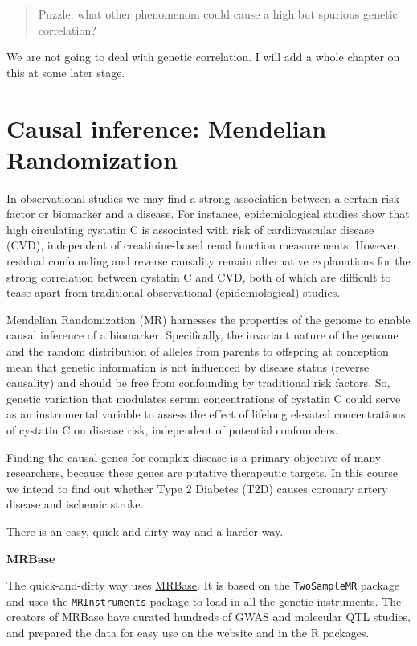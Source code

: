 \documentclass[
]{book}
\begin{document}
\begin{quote}
Puzzle: what other phenomenom could cause a high but spurious genetic correlation?
\end{quote}

We are not going to deal with genetic correlation. I will add a whole chapter on this at some later stage.

\hypertarget{causal-inference-mendelian-randomization}{%
\section{Causal inference: Mendelian Randomization}\label{causal-inference-mendelian-randomization}}

In observational studies we may find a strong association between a certain risk factor or biomarker and a disease. For instance, epidemiological studies show that high circulating cystatin C is associated with risk of cardiovascular disease (CVD), independent of creatinine-based renal function measurements\citep{vanderlaan2016}. However, residual confounding and reverse causality remain alternative explanations for the strong correlation between cystatin C and CVD, both of which are difficult to tease apart from traditional observational (epidemiological) studies.

Mendelian Randomization (MR) harnesses the properties of the genome to enable causal inference of a biomarker. Specifically, the invariant nature of the genome and the random distribution of alleles from parents to offspring at conception mean that genetic information is not influenced by disease status (reverse causality) and should be free from confounding by traditional risk factors\citep{vanderlaan2016}. So, genetic variation that modulates serum concentrations of cystatin C could serve as an instrumental variable to assess the effect of lifelong elevated concentrations of cystatin C on disease risk, independent of potential confounders\citep{vanderlaan2016}.

Finding the causal genes for complex disease is a primary objective of many researchers, because these genes are putative therapeutic targets. In this course we intend to find out whether Type 2 Diabetes (T2D) causes coronary artery disease and ischemic stroke.

There is an easy, quick-and-dirty way and a harder way.

\textbf{MRBase}

The quick-and-dirty way uses \href{http://www.mrbase.org/}{MRBase}. It is based on the \texttt{TwoSampleMR} package and uses the \texttt{MRInstruments} package to load in all the genetic instruments. The creators of MRBase have curated hundreds of GWAS and molecular QTL studies, and prepared the data for easy use on the website and in the R packages.
\end{document}
